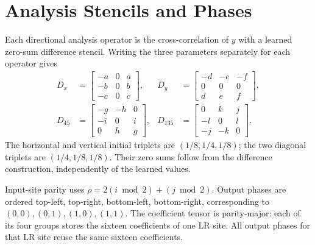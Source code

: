 \documentclass[10pt,twocolumn,letterpaper]{article}
\begin{document}
\raggedbottom
{}
\section{Analysis Stencils and Phases}
\label{app:stencils}
Each directional analysis operator is the cross-correlation of $y$ with a learned zero-sum difference stencil.
Writing the three parameters separately for each operator gives
\begin{align}
 D_x&=\begin{bmatrix}-a&0&a\\-b&0&b\\-c&0&c\end{bmatrix},&
 D_y&=\begin{bmatrix}-d&-e&-f\\0&0&0\\d&e&f\end{bmatrix},\\
 D_{45}&=\begin{bmatrix}-g&-h&0\\-i&0&i\\0&h&g\end{bmatrix},&
 D_{135}&=\begin{bmatrix}0&k&j\\-l&0&l\\-j&-k&0\end{bmatrix}.
 \label{eq:stencils}
\end{align}
The horizontal and vertical initial triplets are $(1/8,1/4,1/8)$; the two diagonal triplets are $(1/4,1/8,1/8)$.
Their zero sums follow from the difference construction, independently of the learned values.

Input-site parity uses $\rho=2(i\bmod2)+(j\bmod2)$.
Output phases are ordered top-left, top-right, bottom-left, bottom-right, corresponding to $(0,0),(0,1),(1,0),(1,1)$.
The coefficient tensor is parity-major: each of its four groups stores the sixteen coefficients of one LR site.
All output phases for that LR site reuse the same sixteen coefficients.
\end{document}
